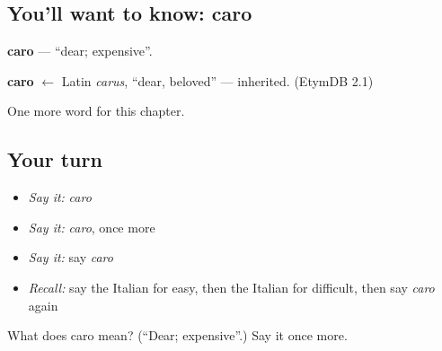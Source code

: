 \subsection*{You'll want to know: caro}
\textbf{caro} — \textquotedblleft{}dear; expensive\textquotedblright{}.

\begin{cousinweb}
\textbf{caro} $\leftarrow$ Latin \emph{carus}, \textquotedblleft{}dear, beloved\textquotedblright{} — inherited. (EtymDB 2.1)
\end{cousinweb}

\begin{grammarlens}[title={What you've built}]
One more word for this chapter.
\end{grammarlens}

\subsection*{Your turn}
\begin{itemize}
\raggedright
  \item \emph{Say it:} \emph{caro}
  \item \emph{Say it:} \emph{caro}, once more
  \item \emph{Say it:} say \emph{caro}
  \item \emph{Recall:} say the Italian for easy, then the Italian for difficult, then say \emph{caro} again
\end{itemize}

\begin{tcolorbox}[breakable,colback=teal!4,colframe=teal!35!black,title={Before you move on}]
What does caro mean? (\textquotedblleft{}Dear; expensive\textquotedblright{}.) Say it once more.
\end{tcolorbox}
